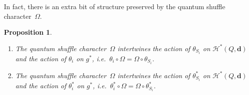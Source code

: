 \documentclass[pdftex]{sigma}
\numberwithin{equation}{section}
\newtheorem{Proposition}[Theorem]{Proposition}
{ \theoremstyle{definition}
\newtheorem{Definition}[Theorem]{Definition}
\newtheorem{Example}[Theorem]{Example}
\newtheorem{Remark}[Theorem]{Remark}
}
\begin{document}
In fact, there is an extra bit of structure preserved by the quantum shuf\/f\/le character~$\Omega$.
\begin{Proposition}%
\qquad
\begin{enumerate}[\upshape (a)]\itemsep=0pt
\item The quantum shuffle character~$\Omega$ intertwines the action of $\theta_{S_i}$ on $\mathcal{H}^*(Q,\mathbf{d})$
and the action of $\theta_i$ on $g^*$, i.e.~$\theta_i\circ\Omega=\Omega\circ\theta_{S_i}$.
\item The quantum shuffle character~$\Omega$ intertwines the action of $\theta^*_{S_i}$ on $\mathcal{H}^*(Q,\mathbf{d})$
and the action of $\theta^*_i$ on $g^*$, i.e.~$\theta^*_i\circ\Omega=\Omega\circ\theta^*_{S_i}$.
\end{enumerate}
\end{Proposition}
\end{document}
